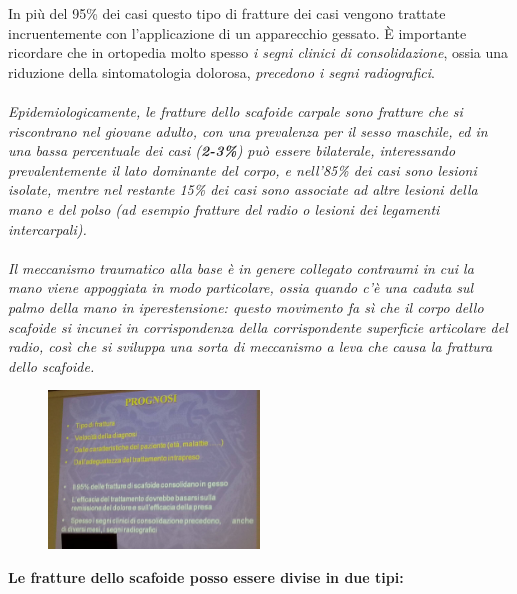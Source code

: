 In più del 95\% dei casi questo tipo di fratture dei casi vengono trattate incruentemente con l'applicazione di un apparecchio gessato.
È importante ricordare che in ortopedia molto spesso \emph{i segni clinici di consolidazione}, ossia una riduzione della sintomatologia dolorosa, \emph{precedono i segni radiografici}.
\\\\
\emph{Epidemiologicamente, le fratture dello scafoide carpale sono fratture che si riscontrano nel \emph{giovane adulto}, con una prevalenza per il \emph{sesso maschile}, ed in una bassa percentuale dei casi (\textbf{2-3\%}) può essere \emph{bilaterale}, interessando prevalentemente il lato dominante del corpo, e nell'85\% dei casi sono
lesioni isolate, mentre nel restante 15\% dei casi sono associate ad altre lesioni della mano e del polso (ad esempio fratture del radio o lesioni dei legamenti intercarpali).}
\\\\
\emph{Il meccanismo traumatico alla base è in genere collegato con\emph{traumi in cui la mano viene  appoggiata in modo particolare, ossia quando c'è una caduta sul palmo della mano in iperestensione}: questo movimento fa sì che il corpo dello scafoide si incunei in corrispondenza della corrispondente superficie articolare del radio, così che si
sviluppa una sorta di meccanismo a leva che causa la frattura dello scafoide.}

\begin{figure}[!ht]
\centering
\includegraphics[width=0.5\textwidth]{004/image1.jpeg}
\end{figure}

\textbf{Le fratture dello scafoide posso essere divise in due tipi:}

